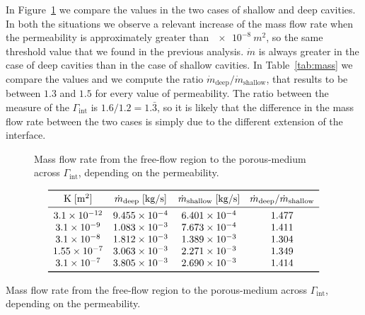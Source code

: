 In Figure~\ref{fig:mass} we compare the values in the two cases of shallow and deep cavities. In both the situations we observe a relevant increase of the mass flow rate when the permeability is approximately greater than $\SI{e-8}{m^2}$, so the same threshold value that we found in the previous analysis. $\dot{m}$ is always greater in the case of deep cavities than in the case of shallow cavities. In Table~\ref{tab:mass} we compare the values and we compute the ratio $\dot{m}_\text{deep} / \dot{m}_\text{shallow}$, that results to be between $1.3$ and $1.5$ for every value of permeability. The ratio between the measure of the $\Gamma_\text{int}$ is $1.6 / 1.2 = 1.\bar{3}$, so it is likely that the difference in the mass flow rate between the two cases is simply due to the different extension of the interface.
\begin{figure}
	\centering
	
	\caption[Mass flow rate across $\Gamma_\text{int}$ depending on the permeability]{Mass flow rate from the free-flow region to the porous-medium across $\Gamma_\text{int}$, depending on the permeability.}
	\label{fig:mass}	
\end{figure}
\begin{table}
	\centering
	\[
	\begin{array}{cccc}
	\toprule
	\mathrm{K} \; [\si{m^2}] & \dot{m}_\text{deep} \; [\si{kg/s}] & \dot{m}_\text{shallow} \; [\si{kg/s}] & \dot{m}_\text{deep} / \dot{m}_\text{shallow}\\
	\midrule
	\num{3.1e-12} & \num{9.455e-4} & \num{6.401e-4} & 1.477\\
	\num{3.1e-9} & \num{1.083e-3} & \num{7.673e-4} & 1.411\\
	\num{3.1e-8} & \num{1.812e-3} & \num{1.389e-3} & 1.304\\
	\num{1.55e-7} & \num{3.063e-3} & \num{2.271e-3} & 1.349\\
	\num{3.1e-7} & \num{3.805e-3} & \num{2.690e-3} & 1.414\\
	\bottomrule
	\end{array}
	\]
	\caption[Mass flow rate across $\Gamma_\text{int}$ depending on the permeability]{Mass flow rate from the free-flow region to the porous-medium across $\Gamma_\text{int}$, depending on the permeability.}
	\label{tab:mass}
\end{table}

